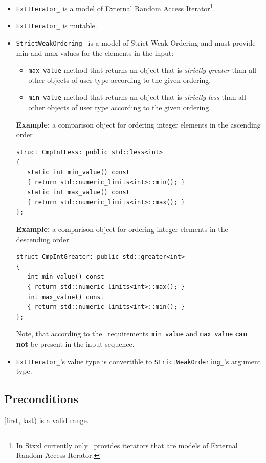 \documentclass[twoside]{book}
\newcommand{\stxxl}{{\sc Stxxl} }
\begin{document}
\begin{itemize}
\item \texttt{ExtIterator\_} is a model of External Random Access
Iterator\footnote{In \stxxl currently only \xvector\ provides
iterators that are models of External Random Access Iterator.}. 
\item \texttt{ExtIterator\_} is mutable.
\item \texttt{StrictWeakOrdering\_} is a model of Strict Weak Ordering
and must provide min and max values for the elements in the input:
 \begin{itemize}
 \item \texttt{max\_value} method that returns an object that is
   \emph{strictly greater} than all other objects of user type according
    to the given ordering. 
 \item \texttt{min\_value} method that returns an object that
    is \emph{strictly less} than all other objects of user type according
    to the given ordering.
 \end{itemize}
 {\bf Example:} 
  a comparison object for ordering integer elements in the ascending
  order
\begin{lstlisting}
struct CmpIntLess: public std::less<int>
{
   static int min_value() const  
   { return std::numeric_limits<int>::min(); }
   static int max_value() const  
   { return std::numeric_limits<int>::max(); }
};
 \end{lstlisting}
 {\bf Example:} 
  a comparison object for ordering integer elements in the descending
  order
\begin{lstlisting}
struct CmpIntGreater: public std::greater<int>
{
   int min_value() const  
   { return std::numeric_limits<int>::max(); }
   int max_value() const  
   { return std::numeric_limits<int>::min(); }
};
 \end{lstlisting}


 Note, that according to the \xsort\ requirements \texttt{min\_value}
and \texttt{max\_value} {\bf can not} be present in the input
sequence.
\item \texttt{ExtIterator\_}'s value type is convertible to
\texttt{StrictWeakOrdering\_}'s argument type.

\end{itemize}

\subsection*{Preconditions}
\label{sortpreconditions}
[first, last) is a valid range.
\end{document}
